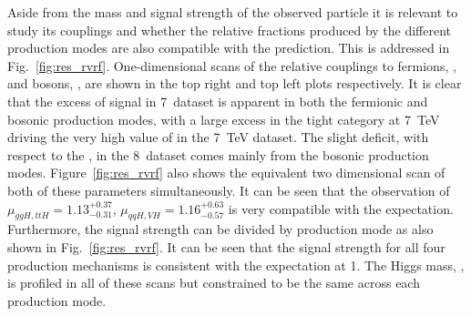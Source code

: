 Aside from the mass and signal strength of the observed particle it is relevant to study its couplings and whether the relative fractions produced by the different production modes are also compatible with the \SM prediction. This is addressed in Fig.~\ref{fig:res_rvrf}. One-dimensional \NLL scans of the relative couplings to fermions, \RF, and bosons, \RV, are shown in the top right and top left plots respectively. It is clear that the excess of signal in 7~\TeV dataset is apparent in both the fermionic and bosonic production modes, with a large excess in the tight \VBF category at 7~TeV driving the very high value of \RV in the 7~TeV dataset. The slight deficit, with respect to the \SM, in the 8~\TeV dataset comes mainly from the bosonic production modes. Figure~\ref{fig:res_rvrf} also shows the equivalent two dimensional \NLL scan of both of these parameters simultaneously. It can be seen that the observation of $\mu_{ggH,ttH}=1.13^{+0.37}_{-0.31}$, $\mu_{qqH,VH}=1.16^{+0.63}_{-0.57}$ is very compatible with the \SM expectation. Furthermore, the signal strength can be divided by production mode as also shown in Fig.~\ref{fig:res_rvrf}. It can be seen that the signal strength for all four production mechanisms is consistent with the \SM expectation at 1. The Higgs mass, \mH, is profiled in all of these scans but constrained to be the same across each production mode.

